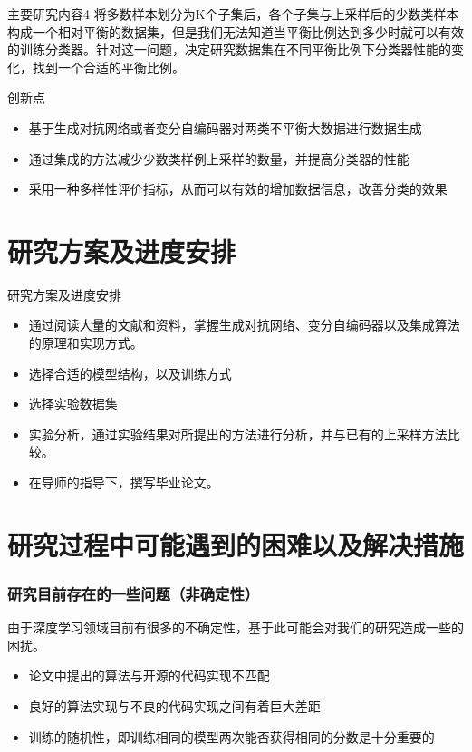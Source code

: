 \documentclass{beamer}
\begin{document}
\begin{frame}{主要研究内容4}\pause
    将多数样本划分为K个子集后，各个子集与上采样后的少数类样本构成一个相对平衡的数据集，但是我们无法知道当平衡比例达到多少时就可以有效的训练分类器。针对这一问题，决定研究数据集在不同平衡比例下分类器性能的变化，找到一个合适的平衡比例。
\end{frame}

\begin{frame}{创新点}\pause
    \begin{itemize}
        \item 基于生成对抗网络或者变分自编码器对两类不平衡大数据进行数据生成
        \item 通过集成的方法减少少数类样例上采样的数量，并提高分类器的性能
        \item 采用一种多样性评价指标，从而可以有效的增加数据信息，改善分类的效果
    \end{itemize}
\end{frame}



\section{研究方案及进度安排}
\begin{frame}{研究方案及进度安排}\pause
    \begin{itemize}
        \item 
        通过阅读大量的文献和资料，掌握生成对抗网络、变分自编码器以及集成算法的原理和实现方式。
        \item 
        选择合适的模型结构，以及训练方式
        \item 
        选择实验数据集
        \item 
        实验分析，通过实验结果对所提出的方法进行分析，并与已有的上采样方法比较。
        \item 
        在导师的指导下，撰写毕业论文。
    \end{itemize}
\end{frame}

\section{研究过程中可能遇到的困难以及解决措施}

\begin{frame}[c]\frametitle{研究目前存在的一些问题（非确定性）}
    由于深度学习领域目前有很多的不确定性，基于此可能会对我们的研究造成一些的困扰。
    \begin{itemize}
        \item 论文中提出的算法与开源的代码实现不匹配
        \item 良好的算法实现与不良的代码实现之间有着巨大差距
        \item 训练的随机性，即训练相同的模型两次能否获得相同的分数是十分重要的
    \end{itemize}
\end{frame}
\end{document}
